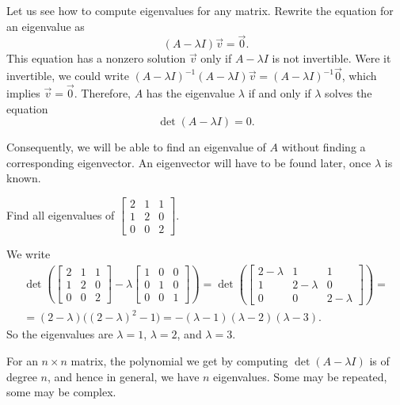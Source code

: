 Let us see how to compute eigenvalues for any matrix.
Rewrite the equation for an eigenvalue as
\begin{equation*}
(A - \lambda I)\vec{v} = \vec{0} .
\end{equation*}
This equation has a nonzero solution $\vec{v}$ only if 
$A - \lambda I$ is not invertible.  Were it invertible,
we could write
${(A - \lambda I)}^{-1}(A - \lambda I)\vec{v} = {(A-\lambda I)}^{-1}\vec{0}$,
which implies $\vec{v} = \vec{0}$.  Therefore,
$A$ has the
eigenvalue $\lambda$ if and only if $\lambda$ solves the equation
\begin{equation*}
\det (A-\lambda I) = 0 .
\end{equation*}

Consequently, we will be able to find an eigenvalue of $A$ without
finding a corresponding eigenvector.  An eigenvector will have to be
found later, once $\lambda$ is known.

\begin{example}
Find all eigenvalues of 
$\left[ \begin{smallmatrix}
2 & 1 & 1 \\
1 & 2 & 0 \\
0 & 0 & 2
\end{smallmatrix} \right]$.

We write
\begin{multline*}
\det \left(
\begin{bmatrix}
2 & 1 & 1 \\
1 & 2 & 0 \\
0 & 0 & 2
\end{bmatrix}
- \lambda 
\begin{bmatrix}
1 & 0 & 0 \\
0 & 1 & 0 \\
0 & 0 & 1
\end{bmatrix}
\right)
=
\det \left(
\begin{bmatrix}
2-\lambda & 1 & 1 \\
1 & 2-\lambda & 0 \\
0 & 0 & 2-\lambda
\end{bmatrix}
\right)
= \\
=
(2-\lambda) \bigl({(2-\lambda)}^2 - 1\bigr)
= 
-(\lambda -1)(\lambda -2)(\lambda-3) .
\end{multline*}
So the eigenvalues are $\lambda = 1$, $\lambda = 2$, and
$\lambda = 3$.
\end{example}

For an $n \times n$ matrix, the polynomial we get by
computing $\det(A - \lambda I)$ is of degree $n$, and hence
in general, we have $n$ eigenvalues.  Some may be repeated, some may be
complex.


